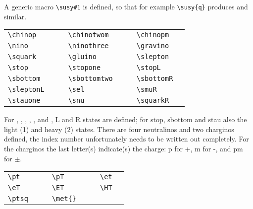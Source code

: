 \documentclass[11pt,a4paper]{cepcnote}
\begin{document}
\medskip

\noindent A generic macro \verb+\susy#1+ is defined, so that for
example \verb+\susy{q}+ produces  and similar.

\medskip

\begin{tabular}{llcllcll}
  \verb+\chinop+ & \chinop{} & \hspace{1cm} &
  \verb+\chinotwom+ & \chinotwom{} & \hspace{1cm} &
  \verb+\chinopm+ & \chinopm{} \\
  \verb+\nino+ & \nino{} & &
  \verb+\ninothree+ & \ninothree{} & &
  \verb+\gravino+ & \gravino{} \\
  \verb+\squark+ & \squark{} & &
  \verb+\gluino+ & \gluino{} & &
  \verb+\slepton+ & \slepton{} \\
  \verb+\stop+ & \stop{} & &
  \verb+\stopone+ & \stopone{} & &
  \verb+\stopL+ & \stopL{} \\
  \verb+\sbottom+ & \sbottom{} & &
  \verb+\sbottomtwo+ & \sbottomtwo{} & &
  \verb+\sbottomR+ & \sbottomR{} \\
  \verb+\sleptonL+ & \sleptonL{} & &
  \verb+\sel+ & \sel{} & &
  \verb+\smuR+ & \smuR{} \\
  \verb+\stauone+ & \stauone{} & &
  \verb+\snu+ & \snu{} & &
  \verb+\squarkR+ & \squarkR{} \\
\end{tabular}

\medskip

\noindent For , , , \slepton, \sel, \smu and
\stau, L and R states are defined; for stop, sbottom and stau also the
light (1) and heavy (2) states. There are four neutralinos and two
charginos defined, the index number unfortunately needs to be written
out completely. For the charginos the last letter(s) indicate(s) the
charge: p for +, m for -, and pm for $\pm$.

\medskip

\begin{tabular}{llcllcll}
  \verb+\pt+ & \pt{} & \hspace{1cm} &
  \verb+\pT+ & \pT{} & \hspace{1cm} &
  \verb+\et+ & \et{} \\
  \verb+\eT+ & \eT{} & &
  \verb+\ET+ & \ET{} & &
  \verb+\HT+ & \HT{} \\
  \verb+\ptsq+ & \ptsq{} & &
  \verb+\met{}+ & \met{} & &
\end{tabular}

\medskip
\end{document}
